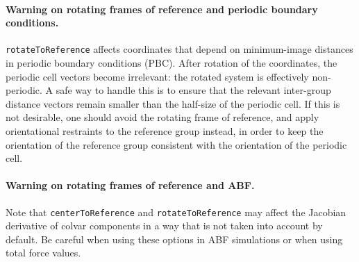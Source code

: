 \paragraph*{Warning on rotating frames of reference and periodic boundary conditions.}
\texttt{rotateToReference} affects coordinates that depend on minimum-image distances in periodic boundary conditions (PBC).
After rotation of the coordinates, the periodic cell vectors become irrelevant: the rotated system is effectively non-periodic.
A safe way to handle this is to ensure that the relevant inter-group distance vectors remain smaller than the half-size of the periodic cell.
If this is not desirable, one should avoid the rotating frame of reference, and apply orientational restraints to the reference group instead, in order to keep the orientation of the reference group consistent with the orientation of the periodic cell.

\paragraph*{Warning on rotating frames of reference and ABF.}
Note that \texttt{centerToReference} and \texttt{rotateToReference} may affect the Jacobian derivative of colvar components in a way that is not taken into account by default.
Be careful when using these options in ABF simulations or when using total force values.

